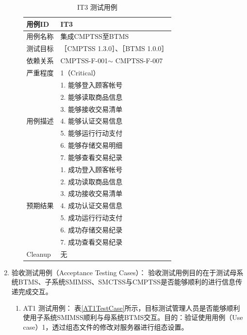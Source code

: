 \begin{enumerate}
\begin{enumerate}
						\begin{table}[!htbp]
						\caption{IT3 测试用例} %
						\centering %
						\label{IT3TestCase} %
						\begin{tabular}{|l|l|}
						\hline
						用例ID & IT3 \\ \hline
						用例名称 & 集成CMPTSS至BTMS \\ \hline
						测试目标 & {［}CMPTSS 1.3.0{］}、{［}BTMS 1.0.0{］} \\ \hline
						依赖关系 & CMPTSS-F-001$\sim$ CMPTSS-F-007 \\ \hline
						严重程度 & 1（Critical） \\ \hline
						\multirow{7}{*}{用例描述} & 1.     能够登入顾客帐号 \\ \cline{2-2} 
						 & 2.     能够读取商品信息 \\ \cline{2-2} 
						 & 3.     能够接收交易清单 \\ \cline{2-2} 
						 & 4.     能够认证交易信息 \\ \cline{2-2} 
						 & 5.     能够运行行动支付 \\ \cline{2-2} 
						 & 6.     能够存储交易明细 \\ \cline{2-2} 
						 & 7.     能够查看交易纪录 \\ \hline
						\multirow{7}{*}{预期结果} & 1.     成功登入顾客帐号 \\ \cline{2-2} 
						 & 2.     成功读取商品信息 \\ \cline{2-2} 
						 & 3.     成功接收交易清单 \\ \cline{2-2} 
						 & 4.     成功认证交易信息 \\ \cline{2-2} 
						 & 5.     成功运行行动支付 \\ \cline{2-2} 
						 & 6.     成功存储交易纪录 \\ \cline{2-2} 
						 & 7.     成功查看交易纪录 \\ \hline
						Cleanup & 无 \\ \hline
						\end{tabular}
						\end{table}
				\end{enumerate}

		\item 验收测试用例（Acceptance Testing Cases）：
			验收测试用例目的在于测试母系统BTMS、子系统SMIMSS、SMCTSS与CMPTSS是否能够顺利的进行信息传递完成交互。

			\begin{enumerate}
				\item AT1 测试用例：
					表\ref{AT1TestCase}所示，目标测试管理人员是否能够顺利使用子系统SMIMSS顺利与母系统BTMS交互。目的：验证使用用例（Use case）1，透过组态文件的修改对服务器进行组态设置。


\end{enumerate}
\end{enumerate}
